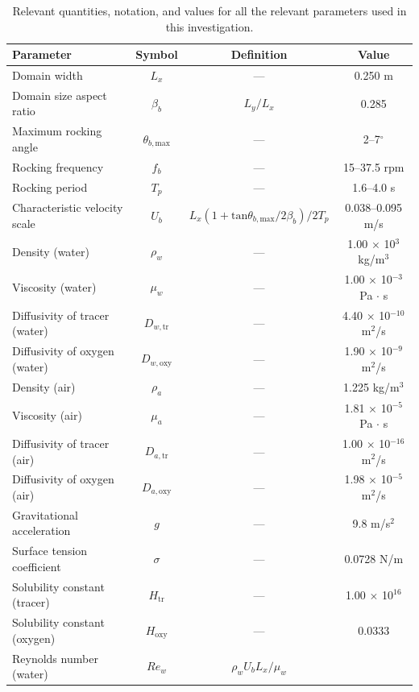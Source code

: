 \documentclass[final,3p,times,twocolumn,authoryear]{elsarticle}
\theoremstyle{definition}
\begin{document}
\begin{table}[h]
\centering
\caption{Relevant quantities, notation, and values for all the relevant parameters used in this investigation.} \label{tab:sim_param}
\begin{tabular}{m{15em} c c c}
\hline
Parameter & Symbol & Definition & Value \\ \hline
Domain width & 
$L_x$ & 
--- & 
0.250 m \\
Domain size aspect ratio & 
$\beta_b$ & 
$L_y/L_x$ & 
0.285 \\
Maximum rocking angle & 
$\theta_{b,\textrm{max}}$ & 
--- & 
2--7$^{\circ}$ \\
Rocking frequency & 
$f_b$ & 
--- & 
15--37.5 rpm \\
Rocking period & 
$T_p$ & 
--- & 
1.6--4.0 s \\
Characteristic velocity scale & 
$U_b$ & 
$L_x(1+\mathrm{tan}\theta_{b,\textrm{max}}/2\beta_b)/2T_p$ & 
0.038--0.095 m/s \\
\hline
Density (water)  & 
$\rho_w$ & 
--- & 
1.00 $\times$ 10$^3$  kg/m$^3$ \\
Viscosity (water)  & 
$\mu_w$ & 
--- & 
1.00 $\times$ 10$^{-3}$ Pa $\cdot$ s \\
Diffusivity of tracer (water)  & 
$D_{w,\textrm{tr}}$ & 
--- & 
4.40 $\times$ 10$^{-10}$ m$^2$/s \\
Diffusivity of oxygen (water)  & 
$D_{w,\textrm{oxy}}$ & 
--- & 
1.90 $\times$ 10$^{-9}$ m$^2$/s \\
Density (air)  & 
$\rho_a$ & 
--- & 
1.225 kg/m$^3$ \\
Viscosity (air)  & 
$\mu_a$ & 
--- & 
1.81 $\times$ 10$^{-5}$ Pa $\cdot$ s \\
Diffusivity of tracer (air)  & 
$D_{a,\textrm{tr}}$ & 
--- & 
1.00 $\times$ 10$^{-16}$ m$^2$/s \\
Diffusivity of oxygen (air)  & 
$D_{a,\textrm{oxy}}$ &
--- & 
1.98 $\times$ 10$^{-5}$ m$^2$/s \\
Gravitational acceleration  & 
$g$ & 
--- & 
9.8 m/s$^2$ \\
Surface tension coefficient  & 
$\sigma$ & 
--- & 
0.0728 N/m \\
Solubility constant (tracer)  & 
$H_{\textrm{tr}}$ & 
--- & 
1.00 $\times$ 10$^{16}$ \\
Solubility constant (oxygen)  & 
$H_{\textrm{oxy}}$ & 
--- & 
0.0333 \\
\hline
Reynolds number (water) & 
$Re_w$ & 
$\rho_w U_b L_x/\mu_w$ & 

\end{tabular}
\end{table}
\end{document}
